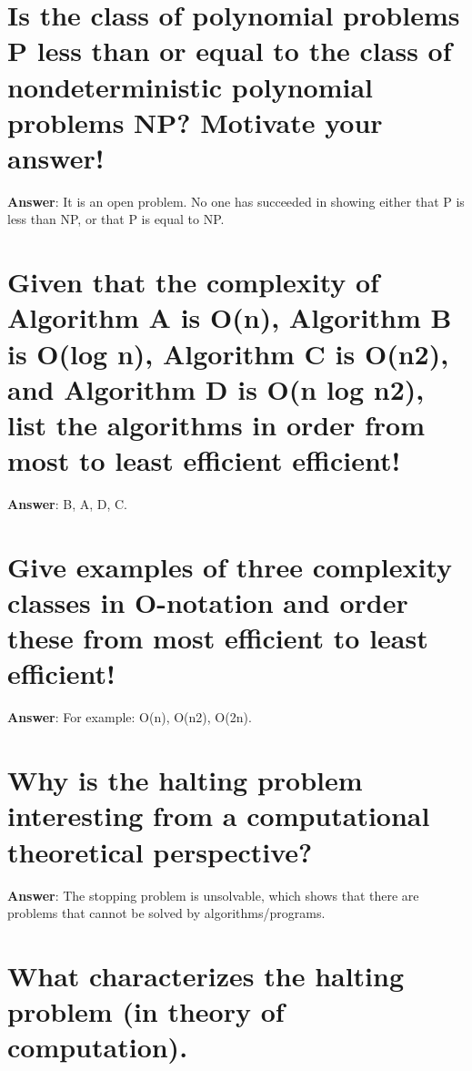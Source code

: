 \documentclass[a4paper,11pt,oneside]{book}
\begin{document}
\begin{sloppypar}
\section{Is the class of polynomial problems P less than or equal to the class of nondeterministic polynomial problems NP? Motivate your answer!}

\label{q:336:sa:en:True}

\textbf{Answer}: It is an open problem. No one has succeeded in showing either that P is less than NP, or that P is equal to NP.



\section{Given that the complexity of Algorithm A is O(n), Algorithm B is O(log n), Algorithm C is O(n2), and Algorithm D is O(n log n2), list the algorithms in order from most to least efficient efficient!}

\label{q:337:sa:en:True}

\textbf{Answer}: B, A, D, C.



\section{Give examples of three complexity classes in O-notation and order these from most efficient to least efficient!}

\label{q:338:sa:en:True}

\textbf{Answer}: For example: O(n), O(n2), O(2n).



\section{Why is the halting problem interesting from a computational theoretical perspective?}

\label{q:339:sa:en:True}

\textbf{Answer}: The stopping problem is unsolvable, which shows that there are problems that cannot be solved by algorithms/programs.



\section{What characterizes the halting problem (in theory of computation).}

\label{q:340:sa:en:True}


\end{sloppypar}
\end{document}
